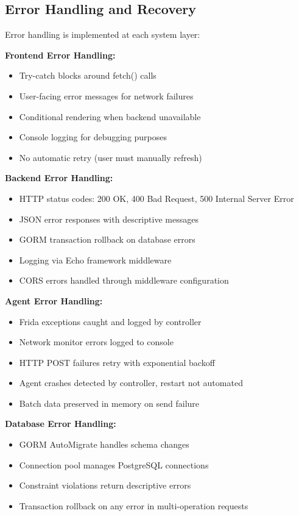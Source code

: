 \subsection{Error Handling and Recovery}

Error handling is implemented at each system layer:

\textbf{Frontend Error Handling:}
\begin{itemize}
    \item Try-catch blocks around fetch() calls
    \item User-facing error messages for network failures
    \item Conditional rendering when backend unavailable
    \item Console logging for debugging purposes
    \item No automatic retry (user must manually refresh)
\end{itemize}

\textbf{Backend Error Handling:}
\begin{itemize}
    \item HTTP status codes: 200 OK, 400 Bad Request, 500 Internal Server Error
    \item JSON error responses with descriptive messages
    \item GORM transaction rollback on database errors
    \item Logging via Echo framework middleware
    \item CORS errors handled through middleware configuration
\end{itemize}

\textbf{Agent Error Handling:}
\begin{itemize}
    \item Frida exceptions caught and logged by controller
    \item Network monitor errors logged to console
    \item HTTP POST failures retry with exponential backoff
    \item Agent crashes detected by controller, restart not automated
    \item Batch data preserved in memory on send failure
\end{itemize}

\textbf{Database Error Handling:}
\begin{itemize}
    \item GORM AutoMigrate handles schema changes
    \item Connection pool manages PostgreSQL connections
    \item Constraint violations return descriptive errors
    \item Transaction rollback on any error in multi-operation requests
\end{itemize}

